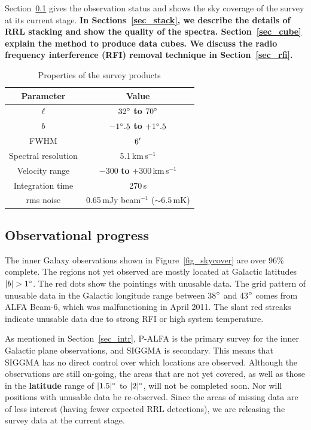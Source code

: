 \documentclass[manuscript]{aastex61}
\newcommand{\kms}{\,km\,s$^{-1}$}
\begin{document}
Section~\ref{sec_obs} gives the observation status and shows the sky coverage of the survey at its current stage.
\textbf{In Sections~\ref{sec_stack}, we describe the details of RRL stacking and show the quality of the spectra.
Section~\ref{sec_cube} explain the method to produce data cubes.
We discuss the radio frequency interference (RFI) removal technique in Section~\ref{sec_rfi}.}

\begin{table}[tbhp]
\centering
\caption{Properties of the survey products \label{tab_survey}}
\begin{threeparttable}
\begin{tabular}{cc}
\hline
\hline
 Parameter & Value\\
\hline
$\ell$  & $32\mbox{$^\circ$}$ \textbf{to} $70\mbox{$^\circ$}$ \\
$b$  & $-1\mbox{$^\circ$}.5$ \textbf{to} $+1\mbox{$^\circ$}.5$ \\
FWHM & $6\mbox{$^\prime$}$ \\
Spectral resolution & 5.1\kms \\
Velocity range & $-300$ \textbf{to} $+300$\kms\\
Integration time & 270\,s \\
rms noise & 0.65\,mJy beam$^{-1}$ ($\sim6.5$\,mK) \\
\hline
\end{tabular}
\end{threeparttable}
\end{table}

\subsection{Observational progress} \label{sec_obs}
The inner Galaxy observations shown in Figure~\ref{fig_skycover} are over 96\% complete.
The regions not yet observed are mostly located at Galactic latitudes $|b|>1\degr$.  The red dots show the pointings with unusable data.  The grid pattern of unusable data in the Galactic longitude range between 38$\mbox{$^\circ$}$ and 43$\mbox{$^\circ$}$ comes from ALFA Beam-6, which was malfunctioning in April 2011.
The slant red streaks indicate unusable data due to strong RFI or high system temperature.

As mentioned in Section~\ref{sec_intr}, P-ALFA is the primary survey for the inner Galactic plane observations, and SIGGMA is secondary.
This means that SIGGMA has no direct control over which locations are observed.  Although the observations are still on-going, the areas that are not yet covered, as well as those in the \textbf{latitude} range of $|1.5|\mbox{$^\circ$}$ to $|2|\mbox{$^\circ$}$, will not be completed soon.  Nor will positions with unusable data be re-observed.
Since the areas of missing data are of less interest (having fewer expected RRL detections), we are releasing the survey data at the current stage.
\end{document}
